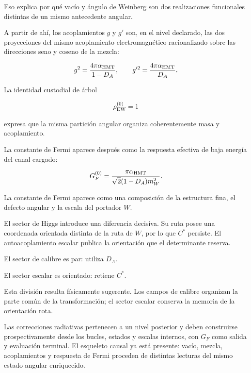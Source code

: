 Eso explica por qué vacío y ángulo de Weinberg son dos realizaciones funcionales distintas de un mismo antecedente angular.\par

A partir de ahí, los acoplamientos \(g\) y \(g'\) son, en el nivel declarado, las dos proyecciones del mismo acoplamiento electromagnético racionalizado sobre las direcciones seno y coseno de la mezcla:\par

\[
g^2
=
\frac{4\pi\alpha_{\rm HMT}}{1-D_A},
\qquad
g'^2
=
\frac{4\pi\alpha_{\rm HMT}}{D_A}.
\]

La identidad custodial de árbol\par

\[
\rho_{\rm EW}^{(0)}=1
\]

expresa que la misma partición angular organiza coherentemente masa y acoplamiento.\par

La constante de Fermi aparece después como la respuesta efectiva de baja energía del canal cargado:\par

\[
G_F^{(0)}
=
\frac{\pi\alpha_{\rm HMT}}
{\sqrt2(1-D_A)m_W^2}.
\]

La constante de Fermi aparece como una composición de la estructura fina, el defecto angular y la escala del portador \(W\).\par

El sector de Higgs introduce una diferencia decisiva. Su ruta posee una coordenada orientada distinta de la ruta de \(W\), por lo que \(C^*\) persiste. El autoacoplamiento escalar publica la orientación que el determinante reserva.\par

El sector de calibre es par: utiliza \(D_A\).\par
El sector escalar es orientado: retiene \(C^*\).\par

Esta división resulta físicamente sugerente. Los campos de calibre organizan la parte común de la transformación; el sector escalar conserva la memoria de la orientación rota.\par

Las correcciones radiativas pertenecen a un nivel posterior y deben construirse prospectivamente desde los bucles, estados y escalas internos, con \(G_F\) como salida y evaluación terminal. El esqueleto causal ya está presente: vacío, mezcla, acoplamientos y respuesta de Fermi proceden de distintas lecturas del mismo estado angular enriquecido.\par

